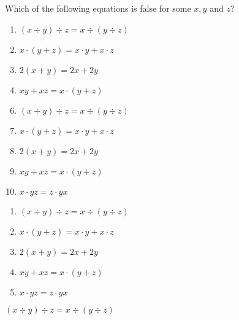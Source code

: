 

 Which of the following equations is false for some $x,y$ and $z$?


\ifsat
	\begin{enumerate}[label=\Alph*)]
		\item   $(x\div y)\div z = x\div (y\div z) $%
		\item  $x\cdot(y+z)=x\cdot y + x\cdot z$
		\item  $2(x+y)=2x+2y$
		\item  $xy+xz=x\cdot(y+z)$
	\end{enumerate}
\else
\fi

\ifacteven
	\begin{enumerate}[label=\textbf{\Alph*.},itemsep=\fill,align=left]
		\setcounter{enumii}{5}
		\item   $(x\div y)\div z = x\div (y\div z) $%
		\item  $x\cdot(y+z)=x\cdot y + x\cdot z$
		\item  $2(x+y)=2x+2y$
		\addtocounter{enumii}{1}
		\item  $xy+xz=x\cdot(y+z)$
		\item   $x\cdot yz = z \cdot yx$
	\end{enumerate}
\else
\fi

\ifactodd
	\begin{enumerate}[label=\textbf{\Alph*.},itemsep=\fill,align=left]
		\item   $(x\div y)\div z = x\div (y\div z) $%
		\item  $x\cdot(y+z)=x\cdot y + x\cdot z$
		\item  $2(x+y)=2x+2y$
		\item  $xy+xz=x\cdot(y+z)$
		\item   $x\cdot yz = z \cdot yx$
	\end{enumerate}
\else
\fi

\ifgridin
   $(x\div y)\div z = x\div (y\div z) $%
		
\else
\fi

